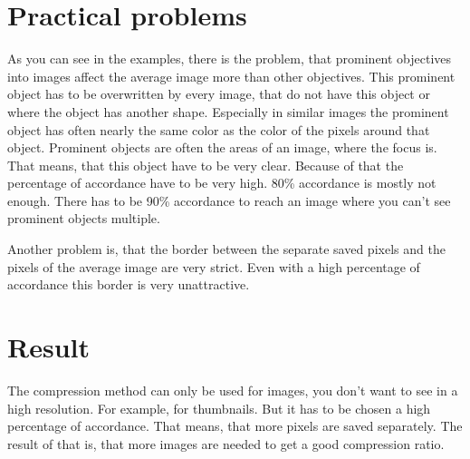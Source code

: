 \documentclass[10pt,a4paper,parskip=full]{scrartcl}
\begin{document}
	\justifying

	\section{Practical problems}
	As you can see in the examples, there is the problem, that prominent objectives into images affect the average image more than other objectives. This prominent object has to be overwritten by every image, that do not have this object or where the object has another shape. Especially in similar images the prominent object has often nearly the same color as the color of the pixels around that object. Prominent objects are often the areas of an image, where the focus is. That means, that this object have to be very clear.
	Because of that the percentage of accordance have to be very high. 80\% accordance is mostly not enough. There has to be 90\% accordance to reach an image where you can't see prominent objects multiple.
	
	Another problem is, that the border between the separate saved pixels and the pixels of the average image are very strict. Even with a high percentage of accordance this border is very unattractive.
	
	\section{Result}
	The compression method can only be used for images, you don't want to see in a high resolution. For example, for thumbnails. But it has to be chosen a high percentage of accordance. That means, that more pixels are saved separately. The result of that is, that more images are needed to get a good compression ratio.
\end{document}
